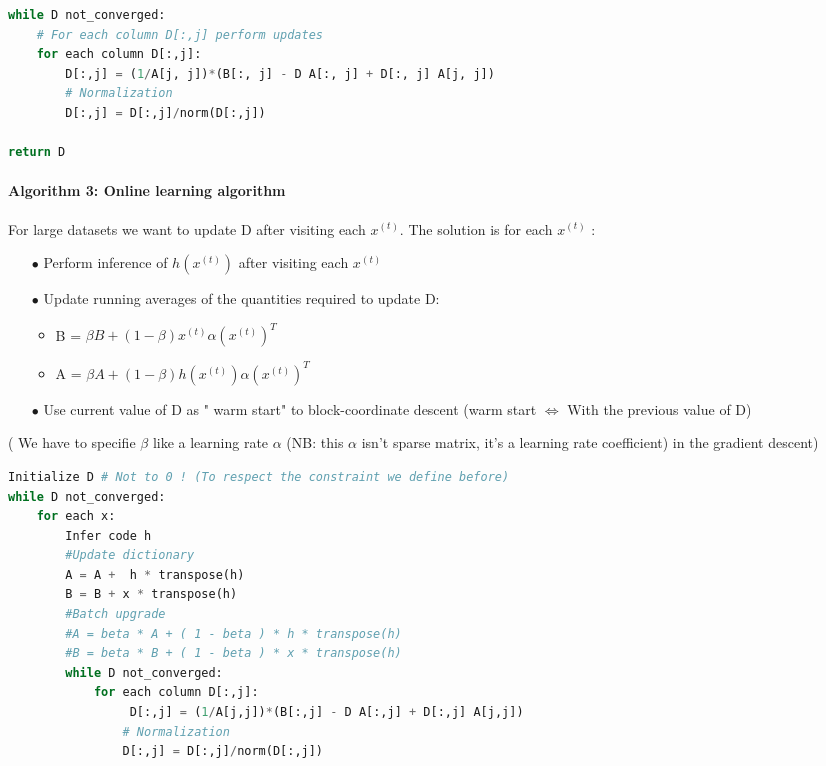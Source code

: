 \documentclass[a4paper,10pt]{article}
\begin{document}
\begin{lstlisting}[language=Python,frame=single]
while D not_converged:
    # For each column D[:,j] perform updates
    for each column D[:,j]:
        D[:,j] = (1/A[j, j])*(B[:, j] - D A[:, j] + D[:, j] A[j, j])
        # Normalization
        D[:,j] = D[:,j]/norm(D[:,j])

return D
\end{lstlisting}

\paragraph{Algorithm 3:  Online learning algorithm}
For large datasets we want to update D after  visiting each $x^{(t)}$. The solution is for each $x^{(t)}$ \cite{Mairal:2009:ODL:1553374.1553463} :
\begin{itemize}
 \item[$\bullet$]  Perform inference of $h(x^{(t)})$ after visiting each $x^{(t)}$
 \item[$\bullet$]  Update running averages of the quantities required to update D: 
        \begin{itemize}
         \item B = $\beta B + (1 - \beta) x^{(t)}\alpha(x^{(t)})^T$
         \item A = $\beta A + (1 - \beta)h(x^{(t)}) \alpha(x^{(t)})^T$
        \end{itemize}
\item[$\bullet$] Use current value of D as " warm start" to block-coordinate descent (warm start $\iff$ With the previous value of D)
\end{itemize}
( We have to specifie $\beta$ like a learning rate $\alpha$ (NB: this $\alpha$ isn't sparse matrix, it's a learning rate coefficient) in the gradient descent)

\begin{lstlisting}[language=Python,frame=single]
Initialize D # Not to 0 ! (To respect the constraint we define before)
while D not_converged:
    for each x:
        Infer code h
        #Update dictionary
        A = A +  h * transpose(h)
        B = B + x * transpose(h)
        #Batch upgrade
        #A = beta * A + ( 1 - beta ) * h * transpose(h)
        #B = beta * B + ( 1 - beta ) * x * transpose(h)
        while D not_converged:
            for each column D[:,j]:
                 D[:,j] = (1/A[j,j])*(B[:,j] - D A[:,j] + D[:,j] A[j,j])
                # Normalization
                D[:,j] = D[:,j]/norm(D[:,j]) 
\end{lstlisting}
\end{document}
